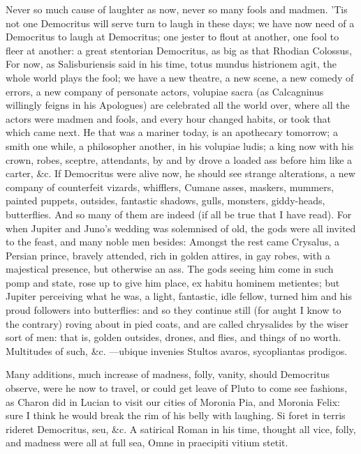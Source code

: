 {Never so much cause of laughter as now, never so many fools and madmen.
'Tis not one Democritus will serve turn to laugh in these days; we
have now need of a Democritus to laugh at Democritus; one jester to
flout at another, one fool to fleer at another: a great stentorian
Democritus, as big as that Rhodian Colossus, For now, as
Salisburiensis said in his time, totus mundus histrionem agit, the
whole world plays the fool; we have a new theatre, a new scene, a new
comedy of errors, a new company of personate actors, volupiae sacra (as
Calcagninus willingly feigns in his Apologues) are celebrated all the
world over, where all the actors were madmen and fools, and every
hour changed habits, or took that which came next. He that was a
mariner today, is an apothecary tomorrow; a smith one while, a
philosopher another, in his volupiae ludis; a king now with his crown,
robes, sceptre, attendants, by and by drove a loaded ass before him
like a carter, \&c. If Democritus were alive now, he should see strange
alterations, a new company of counterfeit vizards, whifflers, Cumane
asses, maskers, mummers, painted puppets, outsides, fantastic shadows,
gulls, monsters, giddy-heads, butterflies. And so many of them are
indeed (if all be true that I have read). For when Jupiter and
Juno's wedding was solemnised of old, the gods were all invited to the
feast, and many noble men besides: Amongst the rest came Crysalus, a
Persian prince, bravely attended, rich in golden attires, in gay robes,
with a majestical presence, but otherwise an ass. The gods seeing him
come in such pomp and state, rose up to give him place, ex habitu
hominem metientes; but Jupiter perceiving what he was, a light,
fantastic, idle fellow, turned him and his proud followers into
butterflies: and so they continue still (for aught I know to the
contrary) roving about in pied coats, and are called chrysalides by the
wiser sort of men: that is, golden outsides, drones, and flies, and
things of no worth. Multitudes of such, \&c.
---ubique invenies
Stultos avaros, sycopliantas prodigos.

Many additions, much increase of madness, folly, vanity, should
Democritus observe, were he now to travel, or could get leave of Pluto
to come see fashions, as Charon did in Lucian to visit our cities of
Moronia Pia, and Moronia Felix: sure I think he would break the rim of
his belly with laughing. Si foret in terris rideret Democritus,
seu, \&c. A satirical Roman in his time, thought all vice, folly, and
madness were all at full sea, Omne in praecipiti vitium stetit.

}
